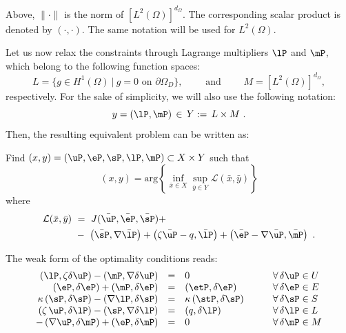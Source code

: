 \begin{remark}
	Above, $\|\cdot\|$ is the norm of $\left[L^2(\Omega)\right]^{d_{\Omega}}$. The corresponding scalar product is denoted by $\left ( \cdot , \cdot \right )$. The same notation will be used for $L^2(\Omega)$.
\end{remark}
Let us now relax the constraints through Lagrange multipliers $\lP$ and $\mP$, which belong to the following function spaces:
\begin{equation*}
	L=\{g\in H^1(\Omega)~|~g=0 \mbox{ on } \partial \Omega_D\},\qquad
	\mbox{ and }\qquad M=\left[L^2(\Omega)\right]^{d_{\Omega}},  
\end{equation*}
respectively. For the sake of simplicity, we will also use the following notation:
\begin{equation}
	y=\left (\lP,\mP\right )\,\in \, Y:=\,L\times M~.
\end{equation}
Then, the resulting equivalent problem can be written as: 
\begin{tcolorbox}[colback=black!10!white, halign = justify, boxrule=0pt]
	\begin{problem*}[P2]
		Find $(x,y)=\left( \uP, \eP, \sP, \lP, \mP \right) \subset X\times Y$ such that 
		\begin{equation}
			(x,y)= \mbox{arg} \left \{ \inf_{\bar{x}\in X} \sup_{\bar{y}\in Y} 
			\mathcal{L}(\bar{x},\bar{y})
			\right \}
		\end{equation}
		where
		\begin{equation}
			\begin{aligned}
				\mathcal{L}(\bar{x},\bar{y}) &~=~J(\bar{\uP},\bar{\eP},\bar{\sP})+ \nonumber \\
				&~-~\left ( \bar{\sP},\nabla \bar{\lP} \right ) + \left (\zeta \bar{\uP} - q , \bar{\lP} \right )  
				+ \left ( \bar{\eP}-\nabla \bar{\uP}, \bar{\mP} \right ) ~.
			\end{aligned} \label{eq:lagrangian}
		\end{equation}
	\end{problem*}
\end{tcolorbox}
The weak form of the optimality conditions reads:
\begin{equation}\label{eq:variational_form}
	\begin{array}{rcll}
		\left ( \lP, \zeta \delta \uP \right ) - \left ( \mP, \nabla \delta \uP \right ) & = & 0 &\qquad \forall \,\delta \uP \in U \\
		\left ( \eP, \delta \eP \right ) + \left ( \mP, \delta \eP \right ) &=& \left ( \etP, \delta \eP \right )  &\qquad \forall \,\delta \eP \in E\\
		\kappa \left ( \sP, \delta \sP \right ) - \left ( \nabla \lP, \delta \sP \right )  & = & \kappa \left ( \stP,\delta \sP \right ) &\qquad \forall\, \delta \sP \in S \\
		\left ( \zeta \,\uP, \delta \lP \right )-\left ( \sP, \nabla \delta \lP \right )  &=& \left ( q, \delta \lP \right ) 	&\qquad \forall\,\delta \lP \in L\\
		-\left (\nabla \uP,\delta \mP \right ) + \left ( \eP, \delta \mP \right ) & = & 0 &\qquad \forall \, \delta \mP \in M 
	\end{array}
\end{equation}


